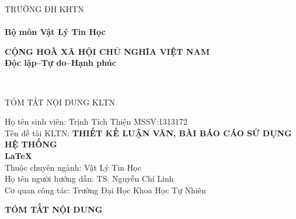 \documentclass[vietnamese]{vlththesis}
\newlength{\mylengthnew}
\begin{document}
\pagestyle{empty}
\hspace{-1.5cm}\begin{minipage}[t]{0.5\textwidth}
\centering
TRƯỜNG ĐH KHTN\\
\theFaculty\\
\textbf{Bộ môn Vật Lý Tin Học}
\end{minipage}
\hfill\hspace{1cm}
\begin{minipage}[t]{0.5\textwidth}
\centering
\bfseries
CỘNG HOÀ XÃ HỘI CHỦ NGHĨA VIỆT NAM\\
Độc lập--Tự do--Hạnh phúc
\end{minipage}
\par~\par
\begin{center}
 \large
TÓM TẮT NỘI DUNG KLTN
\end{center}
\begin{flushleft}
Họ tên sinh viên: Trịnh Tích Thiện \hspace{2in} MSSV:1313172\\
Tên đề tài KLTN: \textbf{THIẾT KẾ LUẬN VĂN, BÀI BÁO CÁO SỬ DỤNG HỆ THỐNG\\ \hspace{\mylengthnew}LaTeX}\\
Thuộc chuyên ngành: Vật Lý Tin Học\\
Họ tên người hướng dẫn: TS. Nguyễn Chí Linh\\
Cơ quan công tác: Trường Đại Học Khoa Học Tự Nhiên
\end{flushleft}
\begin{center}
\textbf{TÓM TẮT NỘI DUNG}
\end{center}
\end{document}
